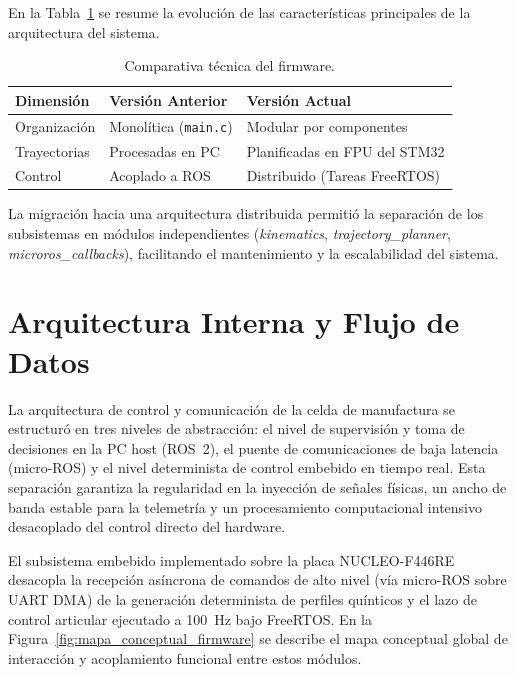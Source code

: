\documentclass[12pt, a4paper]{report}
\begin{document}
En la Tabla~\ref{tab:comparativa_firmware} se resume la evolución de las características principales de la arquitectura del sistema.

\begin{table}[H]
\centering
\begin{tabularx}{\linewidth}{p{4.2cm} X X}
\toprule
\textbf{Dimensión} & \textbf{Versión Anterior} & \textbf{Versión Actual} \\
\midrule
Organización & Monolítica (\texttt{main.c}) & Modular por componentes \\
Trayectorias & Procesadas en PC & Planificadas en FPU del STM32 \\
Control & Acoplado a ROS & Distribuido (Tareas FreeRTOS) \\
\bottomrule
\end{tabularx}
\caption{Comparativa técnica del firmware.}
\label{tab:comparativa_firmware}
\end{table}

La migración hacia una arquitectura distribuida permitió la separación de los subsistemas en módulos independientes (\textit{kinematics}, \textit{trajectory\_planner}, \textit{microros\_callbacks}), facilitando el mantenimiento y la escalabilidad del sistema.

\section{Arquitectura Interna y Flujo de Datos}
La arquitectura de control y comunicación de la celda de manufactura se estructuró en tres niveles de abstracción: el nivel de supervisión y toma de decisiones en la PC host (ROS~2), el puente de comunicaciones de baja latencia (micro-ROS) y el nivel determinista de control embebido en tiempo real. Esta separación garantiza la regularidad en la inyección de señales físicas, un ancho de banda estable para la telemetría y un procesamiento computacional intensivo desacoplado del control directo del hardware.

El subsistema embebido implementado sobre la placa NUCLEO-F446RE desacopla la recepción asíncrona de comandos de alto nivel (vía micro-ROS sobre UART DMA) de la generación determinista de perfiles quínticos y el lazo de control articular ejecutado a 100~Hz bajo FreeRTOS. En la Figura~\ref{fig:mapa_conceptual_firmware} se describe el mapa conceptual global de interacción y acoplamiento funcional entre estos módulos.
\end{document}
